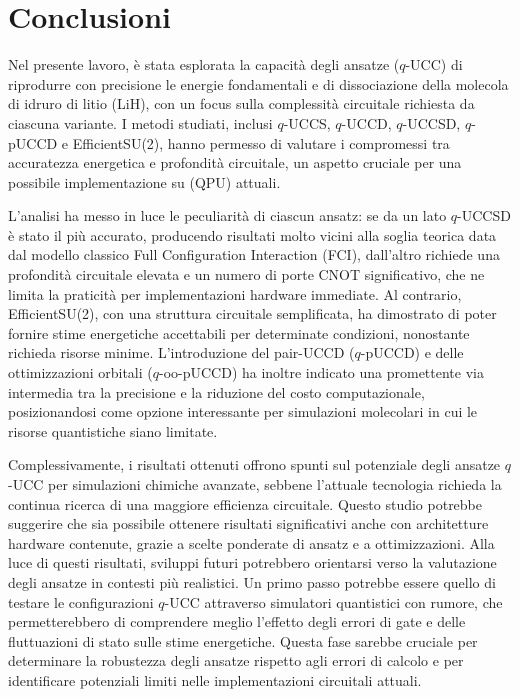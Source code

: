 
\chapter*{Conclusioni}

Nel presente lavoro, è stata esplorata la capacità degli ansatze  ($q$-UCC) di riprodurre con precisione le energie fondamentali e di dissociazione della molecola di idruro di litio (LiH), con un focus sulla complessità circuitale richiesta da ciascuna variante. I metodi studiati, inclusi $q$-UCCS, $q$-UCCD, $q$-UCCSD, $q$-pUCCD e EfficientSU(2), hanno permesso di valutare i compromessi tra accuratezza energetica e profondità circuitale, un aspetto cruciale per una possibile implementazione su  (QPU) attuali.

L’analisi ha messo in luce le peculiarità di ciascun ansatz: se da un lato $q$-UCCSD è stato il più accurato, producendo risultati molto vicini alla soglia teorica data dal modello classico Full Configuration Interaction (FCI), dall’altro richiede una profondità circuitale elevata e un numero di porte CNOT significativo, che ne limita la praticità per implementazioni hardware immediate. Al contrario, EfficientSU(2), con una struttura circuitale semplificata, ha dimostrato di poter fornire stime energetiche accettabili per determinate condizioni, nonostante richieda risorse minime. L’introduzione del  pair-UCCD ($q$-pUCCD) e delle ottimizzazioni orbitali ($q$-oo-pUCCD) ha inoltre indicato una promettente via intermedia tra la precisione e la riduzione del costo computazionale, posizionandosi come opzione interessante per simulazioni molecolari in cui le risorse quantistiche siano limitate.

Complessivamente, i risultati ottenuti offrono spunti sul potenziale degli ansatze $q$-UCC per simulazioni chimiche avanzate, sebbene l’attuale tecnologia richieda la continua ricerca di una maggiore efficienza circuitale. Questo studio potrebbe suggerire che sia possibile ottenere risultati significativi anche con architetture hardware contenute, grazie a scelte ponderate di ansatz e a ottimizzazioni.
Alla luce di questi risultati, sviluppi futuri potrebbero orientarsi verso la valutazione degli ansatze in contesti più realistici. Un primo passo potrebbe essere quello di testare le configurazioni $q$-UCC attraverso simulatori quantistici con rumore, che permetterebbero di comprendere meglio l’effetto degli errori di gate e delle fluttuazioni di stato sulle stime energetiche. Questa fase sarebbe cruciale per determinare la robustezza degli ansatze rispetto agli errori di calcolo e per identificare potenziali limiti nelle implementazioni circuitali attuali.

